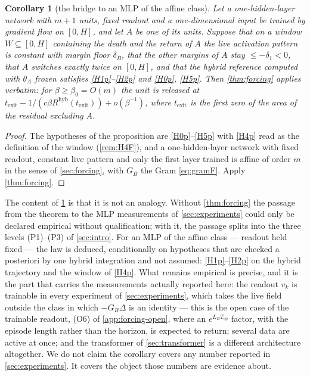 \documentclass[11pt]{article}
\newtheorem{corollary}[corollary]{Corollary}
\theoremstyle{definition}
\theoremstyle{remark}
\newcommand{\texit}{t_{\mathrm{exit}}}
\newcommand{\Tep}{T_{\mathrm{ep}}}   %
\newcommand{\hyb}{\mathrm{hyb}}
\begin{document}
\begin{corollary}[the bridge to an MLP of the affine class]\label{cor:mlp}
Let a one-hidden-layer network with $m+1$ units, \emph{fixed} readout and a
one-dimensional input be trained by gradient flow on $[0,H]$, and let $A$ be one
of its units. Suppose that on a window $W\subseteq[0,H]$ containing the death
and the return of $A$ the live activation pattern is constant with margin floor
$\delta_B$, that the other margins of $A$ stay $\le-\delta_1<0$, that $A$
switches exactly twice on $[0,H]$, and that the hybrid
reference computed with $\theta_A$ frozen satisfies \eqref{H1p}--\eqref{H2p} and
\eqref{H0p}, \eqref{H5p}. Then \cref{thm:forcing} applies verbatim: for
$\beta\ge\beta_0=O(m)$ the unit is released at
$\texit-1/(c\beta R^{\hyb}(\texit))+o(\beta^{-1})$, where $\texit$ is the first
zero of the area of the residual excluding $A$.
\end{corollary}

\begin{proof}
The hypotheses of the proposition are \eqref{H0p}--\eqref{H5p} with \eqref{H4p} read as the
definition of the window (\cref{rem:H4F}), and a one-hidden-layer network with
fixed readout, constant live pattern and only the first layer trained is affine
of order $m$ in the sense of \cref{sec:forcing}, with $G_B$ the Gram
\eqref{eq:gramF}. Apply \cref{thm:forcing}.
\end{proof}

The content of \cref{cor:mlp} is that it is not an analogy. Without
\cref{thm:forcing} the passage from the theorem to the MLP measurements of
\cref{sec:experiments} could only be declared empirical without qualification;
with it, the passage splits into the three levels (P1)--(P3) of
\cref{sec:intro}. For an MLP of the affine class --- readout held fixed --- the
law is deduced, conditionally on hypotheses that are checked a posteriori by one
hybrid integration and not assumed: \eqref{H1p}--\eqref{H2p} on the hybrid trajectory
and the window of \eqref{H4p}. What remains empirical is precise, and it is the part
that carries the measurements actually reported here: the readout $v_k$ is
trainable in every experiment of \cref{sec:experiments}, which takes the live
field outside the class in which $-G_B\Delta$ is an identity --- this is the
open case of the trainable readout, (O6) of \cref{app:forcing-open}, where an
$e^{L_B\Tep}$ factor, with the episode length rather than the horizon, is
expected to return; several data are active at once; and
the transformer of \cref{sec:transformer} is a different architecture
altogether. We do not claim the corollary covers any number reported in
\cref{sec:experiments}. It covers the object those numbers are evidence about.
\end{document}
